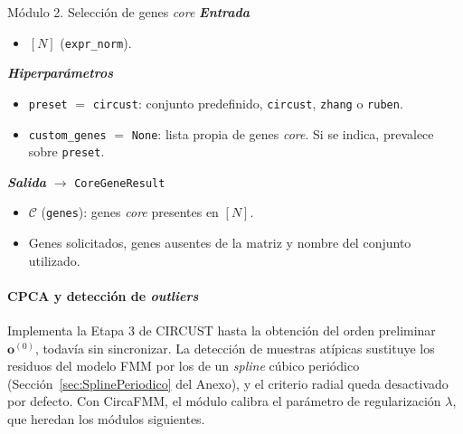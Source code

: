 \documentclass[12pt, a4paper]{report}
\newcommand{\dato}[2]{{\boldmath\textcolor{#1}{#2}}}
\begin{document}
\begin{panel}{Módulo 2. Selección de genes \textit{core}}
\textit{\textbf{Entrada}}
\begin{itemize}[nosep,leftmargin=1.5em]
\item \dato{dN}{\([N]\) (\texttt{expr\_norm})}.
\end{itemize}

\textit{\textbf{Hiperparámetros}}
\begin{itemize}[nosep,leftmargin=1.5em]
\item \texttt{preset} \(=\) \texttt{circust}: conjunto predefinido, \texttt{circust}, \texttt{zhang} o \texttt{ruben}.
\item \texttt{custom\_genes} \(=\) \texttt{None}: lista propia de genes \textit{core}. Si se indica, prevalece sobre \texttt{preset}.
\end{itemize}

\textit{\textbf{Salida}} \(\rightarrow\) \texttt{CoreGeneResult}
\begin{itemize}[nosep,leftmargin=1.5em]
\item \dato{dC}{\(\mathcal{C}\) (\texttt{genes})}: genes \textit{core} presentes en \([N]\).
\item Genes solicitados, genes ausentes de la matriz y nombre del conjunto utilizado.
\end{itemize}
\end{panel}

\paragraph{CPCA y detección de \textit{outliers}}
Implementa la Etapa 3 de CIRCUST hasta la obtención del orden preliminar \(\mathbf{o}^{(0)}\), todavía sin sincronizar. La detección de muestras atípicas sustituye los residuos del modelo FMM por los de un \textit{spline} cúbico periódico (Sección~\ref{sec:SplinePeriodico} del Anexo), y el criterio radial queda desactivado por defecto. Con CircaFMM, el módulo calibra el parámetro de regularización \(\lambda\), que heredan los módulos siguientes.
\end{document}
